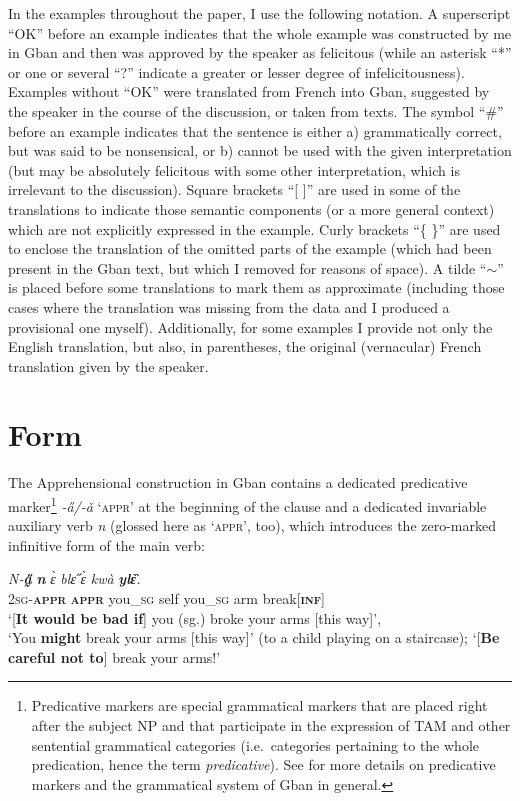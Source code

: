 \documentclass[output=paper,colorlinks,citecolor=brown
]{langscibook}
\begin{document}
In the examples throughout the paper, I use the following notation. A superscript ``OK'' before an example indicates that the whole example was constructed by me in Gban and then was approved by the speaker as felicitous (while an asterisk ``*'' or one or several ``?'' indicate a greater or lesser degree of infelicitousness). Examples without ``OK'' were translated from French into Gban, suggested by the speaker in the course of the discussion, or taken from texts. The symbol ``\#'' before an example indicates that the sentence is either a) grammatically correct, but was said to be nonsensical, or b) cannot be used with the given interpretation (but may be absolutely felicitous with some other interpretation, which is irrelevant to the discussion). Square brackets ``[ ]'' are used in some of the translations to indicate those semantic components (or a more general context) which are not explicitly expressed in the example. Curly brackets ``\{ \}'' are used to enclose the translation of the omitted parts of the example (which had been present in the Gban text, but which I removed for reasons of space). A tilde ``$\sim$'' is placed before some translations to mark them as approximate (including those cases where the translation was missing from the data and I produced a provisional one myself). Additionally, for some examples I provide not only the English translation, but also, in parentheses, the original (vernacular) French translation given by the speaker.


\section{Form}
\label{sec:fedotov:form}

The Apprehensional construction in Gban contains a dedicated predicative marker\footnote{Predicative markers are special grammatical markers that are placed right after the subject NP and that participate in the expression of TAM and other sentential grammatical categories (i.e.\ categories pertaining to the whole predication, hence the term \textit{predicative}). See  for more details on predicative markers and the grammatical system of Gban in general.} \textit{-a̋/-ǎ} `\textsc{appr}' at the beginning of the clause and a dedicated invariable auxiliary verb \textit{n{\ù}} (glossed here as `\textsc{appr}', too), which introduces the zero-marked infinitive form of the main verb:

\ea \label{ex:Fed4}
\gll \textit{N-\textbf{a̰̋}} \textit{\textbf{n{\ù}}} \textit{ɛ̀} \textit{blɛ̋} \textit{ɛ̀} \textit{kwà} \textit{\textbf{ylɛ̏}.} \\
\textsc{2sg-\textbf{appr}} \textsc{\textbf{appr}} you\_\textsc{sg} self you\_\textsc{sg} arm break[\textsc{\textbf{inf}}] \\
\glt `[\textbf{It would be bad if}] you (sg.) broke your arms [this way]', \\
`You \textbf{might} break your arms [this way]' (to a child playing on a staircase); `[\textbf{Be careful not to}] break your arms!'
\z
\end{document}
